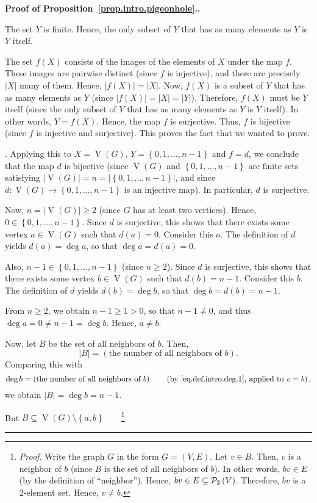 \documentclass[numbers=enddot,12pt,final,onecolumn,notitlepage]{scrartcl}%
\theoremstyle{definition}
\newenvironment{proof}[1][Proof]{\noindent\textbf{#1.} }{\ \rule{0.5em}{0.5em}}
\newcommand{\powset}[2][]{\ifthenelse{\equal{#2}{}}{\mathcal{P}\left(#1\right)}{\mathcal{P}_{#1}\left(#2\right)}}
\newcommand{\set}[1]{\left\{ #1 \right\}}
\newcommand{\abs}[1]{\left| #1 \right|}
\newcommand{\tup}[1]{\left( #1 \right)}
\newcommand{\verts}[1]{\operatorname{V}\left( #1 \right)}
\begin{document}
\begin{proof}[Proof of Proposition~\ref{prop.intro.pigeonhole}.]
{The set $Y$ is finite. Hence, the only subset of $Y$ that has as
many elements as $Y$ is $Y$ itself.

The set $f\tup{X}$ consists of the images of the elements of $X$ under
the map $f$. These images are pairwise distinct (since $f$ is
injective), and there are precisely $\abs{X}$ many of them.
Hence, $\abs{f\tup{X}} = \abs{X}$. Now, $f\tup{X}$ is a subset of $Y$
that has as many elements as $Y$ (since $\abs{f\tup{X}} = \abs{X}
= \abs{Y}$). Therefore, $f\tup{X}$ must be $Y$ itself (since the only
subset of $Y$ that has as many elements as $Y$ is $Y$ itself). In
other words, $Y = f\tup{X}$. Hence, the map $f$ is surjective. Thus,
$f$ is bijective (since $f$ is injective and surjective). This proves
the fact that we wanted to prove.}. Applying this to $X = \verts{G}$,
$Y = \set{0, 1, \ldots, n-1}$ and $f = d$, we conclude that
the map $d$ is bijective (since $\verts{G}$ and
$\set{0, 1, \ldots, n-1}$ are finite sets satisfying
$\abs{\verts{G}} = n = \abs{\set{0, 1, \ldots, n-1}}$, and since
$d : \verts{G} \to \set{0, 1, \ldots, n-1}$ is an injective map).
In particular, $d$ is surjective.

Now, $n = \abs{\verts{G}} \geq 2$ (since $G$ has at least two
vertices). Hence, $0 \in \set{0, 1, \ldots, n-1}$. Since $d$ is
surjective, this shows that there exists some vertex $a \in \verts{G}$
such that $d\tup{a} = 0$. Consider this $a$. The definition of $d$
yields $d\tup{a} = \deg a$, so that $\deg a = d\tup{a} = 0$.

Also, $n-1 \in \set{0, 1, \ldots, n-1}$ (since $n \geq 2$). Since $d$
is surjective, this shows that there exists some vertex
$b \in \verts{G}$
such that $d\tup{b} = n-1$. Consider this $b$. The definition of $d$
yields $d\tup{b} = \deg b$, so that $\deg b = d\tup{b} = n-1$.

From $n \geq 2$, we obtain $n-1 \geq 1 > 0$, so that $n-1 \neq 0$,
and thus $\deg a = 0 \neq n-1 = \deg b$. Hence, $a \neq b$.

Now, let $B$ be the set of all neighbors of $b$. Then,
\[
\abs{B} = \left(\text{the number of all neighbors of } b\right) .
\]
Comparing this with
\[
\deg b = \left(\text{the number of all neighbors of } b\right)
\qquad \left(\text{by \eqref{eq.def.intro.deg.1}, applied to } v = b
\right) ,
\]
we obtain $\abs{B} = \deg b = n-1$.

But $B \subseteq
\verts{G} \setminus \set{a, b}$\ \ \ \ \footnote{\textit{Proof.}
Write the graph $G$ in the form $G = \tup{V, E}$.
Let $v \in B$. Then, $v$ is a neighbor of $b$ (since $B$ is the set of
all neighbors of $b$). In other words, $bv \in E$ (by the definition
of ``neighbor''). Hence, $bv \in E \subseteq \powset[2]{V}$.
Therefore, $bv$ is a $2$-element set. Hence, $v \neq b$.

}
\end{proof}
\end{document}
